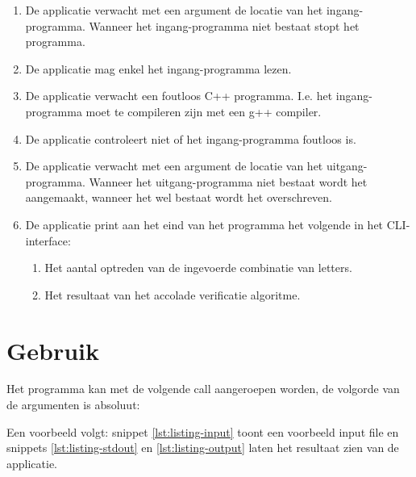 \documentclass[10pt]{article}
\begin{document}
\begin{enumerate}
      \item De applicatie verwacht met een argument de locatie van het ingang-programma. Wanneer het ingang-programma
            niet bestaat stopt het programma.
      \item De applicatie mag enkel het ingang-programma lezen.
      \item De applicatie verwacht een foutloos C++ programma. I.e. het ingang-programma moet te compileren zijn met
            een
            g++ compiler.
      \item De applicatie controleert niet of het ingang-programma foutloos is.
      \item De applicatie verwacht met een argument de locatie van het uitgang-programma. Wanneer het uitgang-programma
            niet bestaat wordt het aangemaakt, wanneer het wel bestaat wordt het overschreven.
      \item De applicatie print aan het eind van het programma het volgende in het CLI-interface:
            \begin{enumerate}
                  \item Het aantal optreden van de ingevoerde combinatie van letters.
                  \item Het resultaat van het accolade verificatie algoritme.
            \end{enumerate}
\end{enumerate}

\section{Gebruik}
Het programma kan met de volgende call aangeroepen worden, de volgorde van de argumenten is absoluut:


Een voorbeeld volgt: snippet \ref{lst:listing-input} toont een voorbeeld input file en snippets
\ref{lst:listing-stdout} en \ref{lst:listing-output} laten het resultaat zien van de applicatie.




\end{document}
